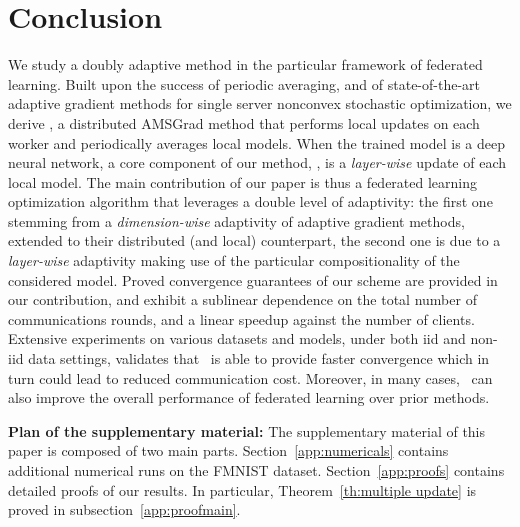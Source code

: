 \documentclass[manuscript,screen,review]{acmart}
\begin{document}
\section{Conclusion}\label{sec:conclusion}

We study a doubly adaptive method in the particular framework of federated learning.
Built upon the success of periodic averaging, and of state-of-the-art adaptive gradient methods for single server nonconvex stochastic optimization, we derive \algo, a distributed AMSGrad method that performs local updates on each worker and periodically averages local models. 
When the trained model is a deep neural network, a core component of our method, \algo, is a \emph{layer-wise} update of each local model.
The main contribution of our paper is thus a federated learning optimization algorithm that leverages a double level of adaptivity: the first one stemming from a \emph{dimension-wise} adaptivity of adaptive gradient methods, extended to their distributed (and local) counterpart, the second one is due to a  \emph{layer-wise} adaptivity making use of the particular compositionality of the considered model.
Proved convergence guarantees of our scheme are provided in our contribution, and exhibit a sublinear dependence on the total number of communications rounds, and a linear speedup against the number of clients. Extensive experiments on various datasets and models, under both iid and non-iid data settings, validates that \algo\ is able to provide faster convergence  which in turn could lead to reduced communication cost. Moreover, in many cases, \algo\ can also improve the overall performance of federated learning over prior methods.




\clearpage






\clearpage

 \appendix 


 \onecolumn

   \hsize\textwidth
   \linewidth{}
 
  \vspace{0.5in}
 
 
 \textbf{Plan of the supplementary material:}
 The supplementary material of this paper is composed of two main parts.
 Section~\ref{app:numericals} contains additional numerical runs on the FMNIST dataset.
 Section~\ref{app:proofs} contains detailed proofs of our results.
 In particular, Theorem~\ref{th:multiple update} is proved in subsection~\ref{app:proofmain}.
\end{document}

